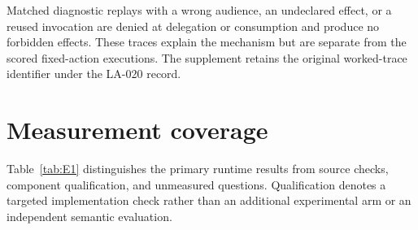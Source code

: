 Matched diagnostic replays with a wrong audience, an undeclared effect, or a reused invocation are denied at delegation or consumption and produce no forbidden effects. These traces explain the mechanism but are separate from the scored fixed-action executions. The supplement retains the original worked-trace identifier under the LA-020 record.

\section{Measurement coverage}
\label{app:coverage}
\setcounter{table}{0}

Table~\ref{tab:E1} distinguishes the primary runtime results from source checks, component qualification, and unmeasured questions. Qualification denotes a targeted implementation check rather than an additional experimental arm or an independent semantic evaluation.

